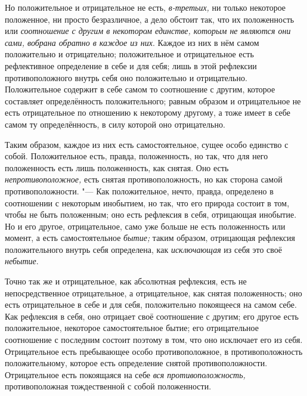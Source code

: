 Но положительное и отрицательное не есть,
{\em в-третьих,} ни только некоторое положенное, ни
просто безразличное, а дело обстоит так, что их положенность или
{\em соотношение с другим в некотором единстве, которым
не являются они сами, вобрана обратно в каждое из них}. Каждое из них в нём
самом положительно и отрицательно; положительное и отрицательное есть
рефлективное определение в себе и для себя; лишь в этой рефлексии
противоположного внутрь себя оно положительно и отрицательно. Положительное
содержит в себе самом то соотношение с другим, которое составляет
определённость положительного; равным образом и отрицательное не есть
отрицательное по отношению к некоторому другому, а тоже имеет в себе самом
ту определённость, в силу которой оно отрицательно.

Таким образом, каждое из них есть самостоятельное, сущее особо единство с
собой. Положительное есть, правда, положенность, но так, что для него
положенность есть лишь положенность, как снятая. Оно есть
{\em непротивоположное,} есть снятая противоположность,
но как сторона самой противоположности. "--- Как положительное, нечто, правда,
определено в соотношении с некоторым инобытием, но так, что его природа
состоит в том, чтобы не быть положенным; оно есть рефлексия в себя,
отрицающая инобытие. Но и его другое, отрицательное, само уже больше не
есть положенность или момент, а есть самостоятельное
{\em бытие;} таким образом, отрицающая рефлексия
положительного внутрь себя определена, как
{\em исключающая} из себя это своё {\em небытие}.

Точно так же и отрицательное, как абсолютная рефлексия, есть не
непосредственное отрицательное, а отрицательное, как снятая положенность;
оно есть отрицательное в себе и для себя, положительно покоящееся на самом
себе. Как рефлексия в себя, оно отрицает своё соотношение с другим; его
другое есть положительное, некоторое самостоятельное бытие; его
отрицательное соотношение с последним состоит поэтому в том, что оно
исключает его из себя. Отрицательное есть пребывающее особо
противоположное, в противоположность положительному, которое есть
определение снятой противоположности. Отрицательное есть покоящаяся на себе
{\em вся противоположность,} противоположная
тождественной с собой положенности.

